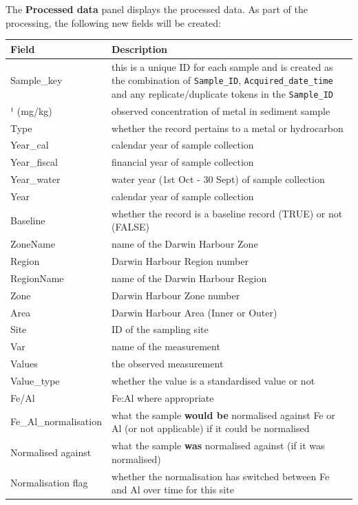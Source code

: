 \documentclass[
  8pt,
  a4paper]{article}
\begin{document}
The \textbf{Processed data} panel displays the processed data. As part
of the processing, the following new fields will be created:

\begin{longtable}[]{@{}
  >{\raggedright\arraybackslash}p{}
  >{\raggedright\arraybackslash}p{}@{}}
\toprule\noalign{}
\begin{minipage}[b]{\linewidth}\raggedright
Field
\end{minipage} & \begin{minipage}[b]{\linewidth}\raggedright
Description
\end{minipage} \\
\midrule\noalign{}
\endhead
\bottomrule\noalign{}
\endlastfoot
Sample\_key & this is a unique ID for each sample and is created as the
combination of \texttt{Sample\_ID}, \texttt{Acquired\_date\_time} and
any replicate/duplicate tokens in the \texttt{Sample\_ID} \\
*¹ (mg/kg) & observed concentration of metal in sediment sample \\
Type & whether the record pertains to a metal or hydrocarbon \\
Year\_cal & calendar year of sample collection \\
Year\_fiscal & financial year of sample collection \\
Year\_water & water year (1st Oct - 30 Sept) of sample collection \\
Year & calendar year of sample collection \\
Baseline & whether the record is a baseline record (TRUE) or not
(FALSE) \\
ZoneName & name of the Darwin Harbour Zone \\
Region & Darwin Harbour Region number \\
RegionName & name of the Darwin Harbour Region \\
Zone & Darwin Harbour Zone number \\
Area & Darwin Harbour Area (Inner or Outer) \\
Site & ID of the sampling site \\
Var & name of the measurement \\
Values & the observed measurement \\
Value\_type & whether the value is a standardised value or not \\
Fe/Al & Fe:Al where appropriate \\
Fe\_Al\_normalisation & what the sample \textbf{would be} normalised
against Fe or Al (or not applicable) if it could be normalised \\
Normalised against & what the sample \textbf{was} normalised against (if
it was normalised) \\
Normalisation flag & whether the normalisation has switched between Fe
and Al over time for this site \\
\end{longtable}
\end{document}
